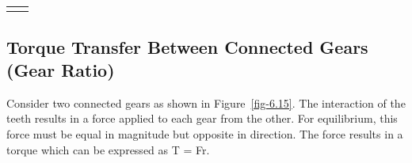 \documentclass[
  letterpaper,
  DIV=11,
  numbers=noendperiod]{scrreprt}
\theoremstyle{definition}
\theoremstyle{remark}
\begin{document}
\begin{longtable}[]{@{}
  >{\raggedright\arraybackslash}p{}
  >{\raggedright\arraybackslash}p{}@{}}
                                                                                                                                                                                                                                                                                                                                                                                                                                                                                                                                                                                                                                                                                                                                                                                                                                                                                                                                                                                                                                                                                                                                                                                                                                                                                                                                                                                                                                                                                                                                                                                                                                                                                                  \) \\
\end{longtable}

\subsection{Torque Transfer Between Connected Gears (Gear
Ratio)}\label{torque-transfer-between-connected-gears-gear-ratio}

Consider two connected gears as shown in Figure~\ref{fig-6.15}. The
interaction of the teeth results in a force applied to each gear from
the other. For equilibrium, this force must be equal in magnitude but
opposite in direction. The force results in a torque which can be
expressed as T = Fr.
\end{document}
